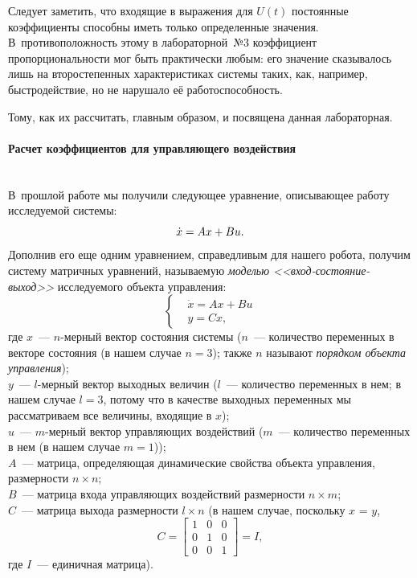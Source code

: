 \documentclass[12pt,a4paper,openany]{extarticle}
\begin{document}
Следует заметить, что входящие в выражения для $U(t)$ постоянные коэффициенты способны иметь только определенные значения.
В~противоположность этому в лабораторной~№3 коэффициент пропорциональности мог быть практически любым: его значение сказывалось лишь на второстепенных характеристиках системы таких, как, например, быстродействие, но не нарушало её работоспособность.

Тому, как их рассчитать, главным образом, и посвящена данная лабораторная.

\paragraph*{Расчет коэффициентов для управляющего воздействия}$\phantom{-}$ \\
\hspace*{\parindent}В~прошлой работе мы получили следующее уравнение, описывающее работу исследуемой системы:
\begin{equation}\label{dx=Ax+Bu}
	\dot x = Ax + Bu\ldotp
\end{equation}
Дополнив его еще одним уравнением, справедливым для нашего робота, получим систему матричных уравнений, называемую \textit{моделью <<вход-состояние-выход>>} исследуемого объекта управления:
\begin{equation}
	\left\{
	\begin{aligned}
		\!&\dot x = Ax + Bu \\
		\!&y = Cx,
	\end{aligned}
	\right.
\end{equation}
где 
$x$~--- $n$-мерный вектор состояния системы ($n$~--- количество переменных в векторе состояния (в нашем случае $n=3$); также $n$ называют \textit{порядком объекта управления}); \\
$y$~--- $l$-мерный вектор выходных величин ($l$~--- количество переменных в нем; в нашем случае $l=3$, потому что в качестве выходных переменных мы рассматриваем все величины, входящие в $x$);\\
$u$~--- $m$-мерный вектор управляющих воздействий ($m$~--- количество переменных в нем (в нашем случае $m=1$));\\
$A$~--- матрица, определяющая динамические свойства объекта управления, размерности $n\times n$;\\
$B$~--- матрица входа управляющих воздействий размерности $n\times m$;\\
$C$~--- матрица выхода размерности $l\times n$ (в нашем случае, поскольку $x$ = $y$,
\begin{equation}
	C = 
	\begin{bmatrix}
		1 & 0 & 0\\
		0 & 1 & 0\\
		0 & 0 & 1
	\end{bmatrix} = I,
\end{equation}
где $I$~--- единичная матрица).
\end{document}
